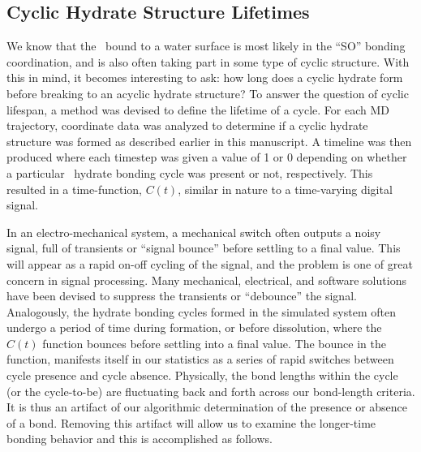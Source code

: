 \subsection {Cyclic Hydrate Structure Lifetimes}

We know that the \suldiox~bound to a water surface is most likely in the ``SO'' bonding coordination, and is also often taking part in some type of cyclic structure. With this in mind, it becomes interesting to ask: how long does a cyclic hydrate form before breaking to an acyclic hydrate structure? To answer the question of cyclic lifespan, a method was devised to define the lifetime of a cycle. For each MD trajectory, coordinate data was analyzed to determine if a cyclic hydrate structure was formed as described earlier in this manuscript. A timeline was then produced where each timestep was given a value of 1 or 0 depending on whether a particular \suldiox~hydrate bonding cycle was present or not, respectively. This resulted in a time-function, $C(t)$, similar in nature to a time-varying digital signal. 

In an electro-mechanical system, a mechanical switch often outputs a noisy signal, full of transients or ``signal bounce'' before settling to a final value. This will appear as a rapid on-off cycling of the signal, and the problem is one of great concern in signal processing. Many mechanical, electrical, and software solutions have been devised to suppress the transients or ``debounce'' the signal. Analogously, the hydrate bonding cycles formed in the simulated system often undergo a period of time during formation, or before dissolution, where the $C(t)$ function bounces before settling into a final value. The bounce in the function, manifests itself in our statistics as a series of rapid switches between cycle presence and cycle absence. Physically, the bond lengths within the cycle (or the cycle-to-be) are fluctuating back and forth across our bond-length criteria. It is thus an artifact of our algorithmic determination of the presence or absence of a bond. Removing this artifact will allow us to examine the longer-time bonding behavior and this is accomplished as follows. 

